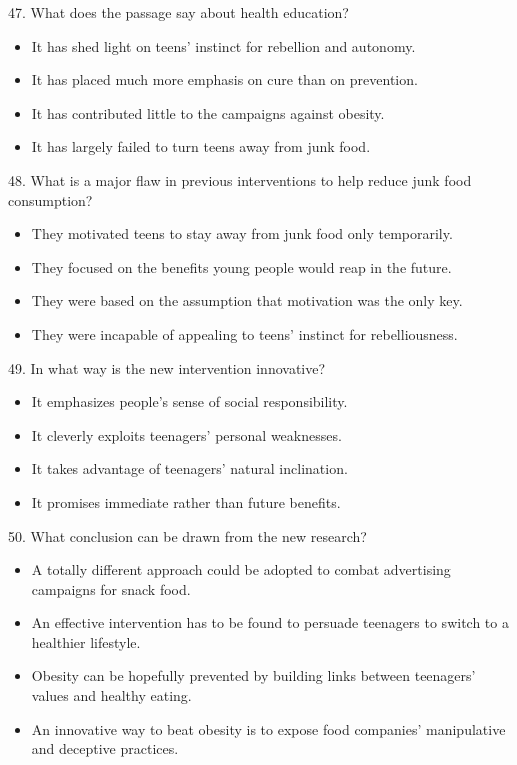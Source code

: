 \documentclass[UTF8,11pt]{ctexart}
\begin{document}
47. What does the passage say about health education?


\begin{itemize}[leftmargin=2em,itemsep=.2em,topsep=.4em]\item[A.] It has shed light on teens’ instinct for rebellion and autonomy.
\item[B.] It has placed much more emphasis on cure than on prevention.
\item[C.] It has contributed little to the campaigns against obesity.
\item[D.] It has largely failed to turn teens away from junk food.
\end{itemize}

48. What is a major flaw in previous interventions to help reduce junk food consumption?


\begin{itemize}[leftmargin=2em,itemsep=.2em,topsep=.4em]\item[A.] They motivated teens to stay away from junk food only temporarily.
\item[B.] They focused on the benefits young people would reap in the future.
\item[C.] They were based on the assumption that motivation was the only key.
\item[D.] They were incapable of appealing to teens’ instinct for rebelliousness.
\end{itemize}

49. In what way is the new intervention innovative?


\begin{itemize}[leftmargin=2em,itemsep=.2em,topsep=.4em]\item[A.] It emphasizes people’s sense of social responsibility.
\item[B.] It cleverly exploits teenagers’ personal weaknesses.
\item[C.] It takes advantage of teenagers’ natural inclination.
\item[D.] It promises immediate rather than future benefits.
\end{itemize}

50. What conclusion can be drawn from the new research?


\begin{itemize}[leftmargin=2em,itemsep=.2em,topsep=.4em]\item[A.] A totally different approach could be adopted to combat advertising campaigns for snack food.
\item[B.] An effective intervention has to be found to persuade teenagers to switch to a healthier lifestyle.
\item[C.] Obesity can be hopefully prevented by building links between teenagers’ values and healthy eating.
\item[D.] An innovative way to beat obesity is to expose food companies’ manipulative and deceptive practices.
\end{itemize}
\end{document}

